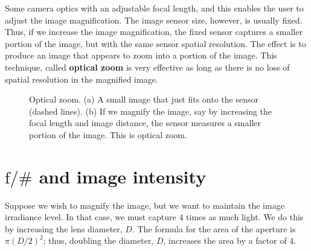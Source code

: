 \documentclass[
  letterpaper,
]{book}
\begin{document}
Some camera optics with an adjustable focal length, and this enables the
user to adjust the image magnification. The image sensor size, however,
is usually fixed. Thus, if we increase the image magnification, the
fixed sensor captures a smaller portion of the image, but with the same
sensor spatial resolution. The effect is to produce an image that
appears to zoom into a portion of the image. This technique, called
\textbf{optical zoom} is very effective as long as there is no loss of
spatial resolution in the magnified image.

\begin{figure}


\caption{\label{fig-optics-zoom}Optical zoom. (a) A small image that
just fits onto the sensor (dashed lines). (b) If we magnify the image,
say by increasing the focal length and image distance, the sensor
measures a smaller portion of the image. This is optical zoom.}

\end{figure}%

\section{\texorpdfstring{\(\mathrm{f}/\#\) and image
intensity}{\textbackslash mathrm\{f\}/\textbackslash\# and image intensity}}\label{sec-optics-fnumberintensity}

Suppose we wish to magnify the image, but we want to maintain the image
irradiance level. In that case, we must capture \(4\) times as much
light. We do this by increasing the lens diameter, \(D\). The formula
for the area of the aperture is \(\pi (D/2)^2\); thus, doubling the
diameter, \(D\), increases the area by a factor of \(4\).
\end{document}
